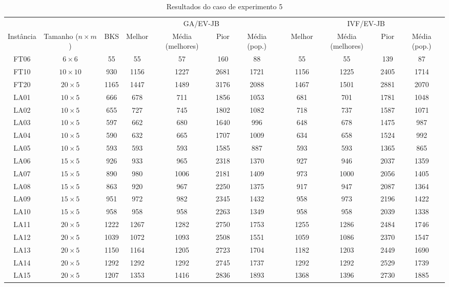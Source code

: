 \begin{sidewaystable}
\caption{Resultados do caso de experimento 5}
\centering
\label{experimento5}
\begin{tabular}{cccccccccccc}
\toprule
& & & \multicolumn{4}{c}{GA/EV-JB} & & \multicolumn{4}{c}{IVF/EV-JB} \\
\cmidrule(c){4-7}
\cmidrule(c){9-12}
Inst\^{a}ncia & Tamanho ($n \times m$) & BKS & Melhor & M\'{e}dia (melhores) & Pior & M\'{e}dia (pop.) & & Melhor & M\'{e}dia (melhores) & Pior & M\'{e}dia (pop.) \\
\midrule
FT06 & $6 \times 6$ & 55 & 55 & 57 & 160 & 88 & & 55 & 55 & 139 & 87 \\
FT10 & $10 \times 10$ & 930 & 1156 & 1227 & 2681 & 1721 & & 1156 & 1225 & 2405 & 1714 \\
FT20 & $20 \times 5$ & 1165 & 1447 & 1489 & 3176 & 2088 & & 1467 & 1501 & 2881 & 2070 \\
LA01 & $10 \times 5$ & 666 & 678 & 711 & 1856 & 1053 & & 681 & 701 & 1781 & 1048 \\
LA02 & $10 \times 5$ & 655 & 727 & 745 & 1802 & 1082 & & 718 & 737 & 1587 & 1071 \\
LA03 & $10 \times 5$ & 597 & 662 & 680 & 1640 & 996 & & 648 & 678 & 1475 & 987 \\
LA04 & $10 \times 5$ & 590 & 632 & 665 & 1707 & 1009 & & 634 & 658 & 1524 & 992 \\
LA05 & $10 \times 5$ & 593 & 593 & 593 & 1585 & 887 & & 593 & 593 & 1365 & 865 \\
LA06 & $15 \times 5$ & 926 & 933 & 965 & 2318 & 1370 & & 927 & 946 & 2037 & 1359 \\
LA07 & $15 \times 5$ & 890 & 980 & 1006 & 2181 & 1409 & & 973 & 1000 & 2056 & 1405 \\
LA08 & $15 \times 5$ & 863 & 920 & 967 & 2250 & 1375 & & 917 & 947 & 2087 & 1364 \\
LA09 & $15 \times 5$ & 951 & 972 & 982 & 2345 & 1432 & & 958 & 973 & 2196 & 1422 \\
LA10 & $15 \times 5$ & 958 & 958 & 958 & 2263 & 1349 & & 958 & 958 & 2039 & 1338 \\
LA11 & $20 \times 5$ & 1222 & 1267 & 1282 & 2750 & 1753 & & 1255 & 1286 & 2484 & 1746 \\
LA12 & $20 \times 5$ & 1039 & 1072 & 1093 & 2508 & 1551 & & 1059 & 1086 & 2370 & 1547 \\
LA13 & $20 \times 5$ & 1150 & 1164 & 1205 & 2723 & 1704 & & 1182 & 1203 & 2449 & 1690 \\
LA14 & $20 \times 5$ & 1292 & 1292 & 1292 & 2745 & 1737 & & 1292 & 1292 & 2529 & 1739 \\
LA15 & $20 \times 5$ & 1207 & 1353 & 1416 & 2836 & 1893 & & 1368 & 1396 & 2730 & 1885 \\
\bottomrule
\end{tabular}
\end{sidewaystable}
